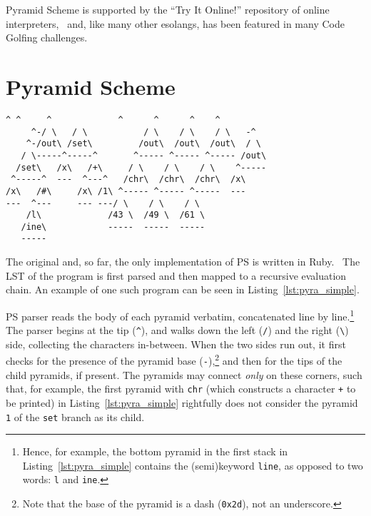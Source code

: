 \documentclass[aip,jcp,reprint,footinbib]{revtex4-1}
\let\tt\texttt
\newcommand{\ilpsll}[1]{\lstinline[language=psll,columns=flexible]{#1}}
\begin{document}
Pyramid Scheme is supported by the \enquote{Try It Online!} repository of online interpreters,~\cite{tio} and, like many other esolangs, has been featured in many Code Golfing challenges.~\cite{golf_se}

\section{Pyramid Scheme}

\begin{lstlisting}[float,language=pyra,
    label=lst:pyra_simple, caption={
        A simple Pyramid Scheme program. It takes one input from \tt{stdin} -- \ilpsll{(set x (\# stdin))}, increments it by one -- \ilpsll{(set x (+ x 1))} and prints the result computation to the command line.
}]
      ^ ^     ^             ^      ^      ^    ^
     ^-/ \   / \           / \    / \    / \   -^
    ^-/out\ /set\         /out\  /out\  /out\  / \
   / \-----^-----^       ^----- ^----- ^----- /out\
  /set\   /x\   /+\     / \    / \    / \    ^-----
 ^-----^  ---  ^---^   /chr\  /chr\  /chr\  /x\
/x\   /#\     /x\ /1\ ^----- ^----- ^-----  ---
---  ^---     --- ---/ \    / \    / \
    /l\             /43 \  /49 \  /61 \
   /ine\            -----  -----  -----
   -----
\end{lstlisting}

The original and, so far, the only implementation of PS is written in Ruby.~\cite{pyra_git} The LST of the program is first parsed and then mapped to a recursive evaluation chain. An example of one such program can be seen in Listing~\ref{lst:pyra_simple}.

PS parser reads the body of each pyramid verbatim, concatenated line by line.\footnote{Hence, for example, the bottom pyramid in the first stack in Listing~\ref{lst:pyra_simple} contains the (semi)keyword \tt{line}, as opposed to two words: \tt{l} and \tt{ine}.} The parser begins at the tip (\tt{\^}), and walks down the left (\tt{/}) and the right (\tt{\textbackslash}) side, collecting the characters in-between. When the two sides run out, it first checks for the presence of the pyramid base (\tt{-}),\footnote{Note that the base of the pyramid is a dash (\tt{0x2d}), not an underscore.} and then for the tips of the child pyramids, if present. The pyramids may connect \emph{only} on these corners, such that, for example, the first pyramid with \tt{chr} (which constructs a character \tt{+} to be printed) in Listing~\ref{lst:pyra_simple} rightfully does not consider the pyramid \tt{1} of the \tt{set} branch as its child.
\end{document}
